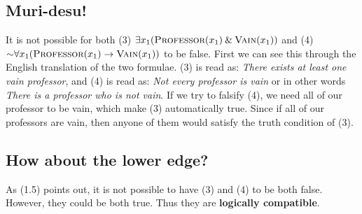 \documentclass{article}
\begin{document}
\subsection{Muri-desu!}
It is not possible for both (3) $\exists x_1 (\textsc{Professor}(x_1)\mathbin{\&} \textsc{Vain}(x_1))$ and (4) $\mathord{\sim} \forall x_1 (\textsc{Professor}(x_1)\rightarrow \textsc{Vain}(x_1))$ to be false. First we can see this through the English translation of the two formulae. (3) is read as: \textit{There exists at least one vain professor}, and (4) is read as: \textit{Not every professor is vain} or in other words \textit{There is a professor who is not vain}. If we try to falsify (4), we need all of our professor to be vain, which make (3) automatically true. Since if all of our professors are vain, then anyone of them would satisfy the truth condition of (3). 

\subsection{How about the lower edge?}
As (1.5) points out, it is not possible to have (3) and (4) to be both false. However, they could be both true. Thus they are \textbf{logically compatible}.
\end{document}
